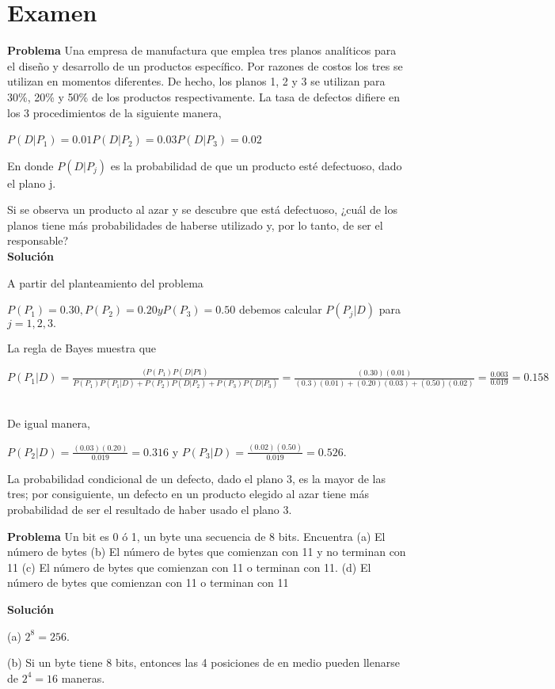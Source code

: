 \section{Examen}

\textbf{Problema}
Una empresa de manufactura que emplea tres planos analíticos para el diseño y
desarrollo de un productos específico. Por razones de costos los tres se
utilizan en momentos diferentes. De hecho, los planos 1, 2 y 3 se utilizan para
30\%, 20\% y 50\% de los productos respectivamente. La tasa de defectos difiere
en los 3 procedimientos de la siguiente manera,\

$P(D|P_1)=0.01 P(D|P_2)=0.03 P(D|P_3)=0.02 $ \

En donde $P(D|P_j)$ es la probabilidad de que un producto esté defectuoso, dado
el plano j.\

Si se observa un producto al azar y se descubre que está defectuoso, ¿cuál de
los planos tiene más probabilidades de haberse utilizado y, por lo tanto, de ser
el responsable?\\

\textbf{Solución} \

A partir del planteamiento del problema \

$P(P_1)=0.30, P(P_2)=0.20 y P(P_3)=0.50$ debemos calcular $P(P_j|D)$ para $j =
1, 2, 3.$

La regla de Bayes muestra que\

$P(P_1|D)=\frac{(P(P_1)P(D|P1)}{P(P_1)P(P_1|D)+P(P_2)P(D|P_2)+P(P_3)P(D|P_3)} =
\frac{(0.30)(0.01)}{(0.3)(0.01)+(0.20)(0.03)+(0.50)(0.02)}=\frac{0.003}{0.019}=0.158$\ 

De igual manera,\

$P(P_2|D) = \frac{(0.03)(0.20)}{0.019} = 0.316$ y
$P(P_3|D)=\frac{(0.02)(0.50)}{0.019}=0.526.$\

La probabilidad condicional de un defecto, dado el plano 3, es la mayor de las
tres; por consiguiente, un defecto en un producto elegido al azar tiene más
probabilidad de ser el resultado de haber usado el plano 3.

\textbf{Problema}
Un bit es 0 ó 1, un byte una secuencia de 8 bits. Encuentra (a) El número de
bytes (b) El número de bytes que comienzan con 11 y no terminan con 11 (c) El
número de bytes que comienzan con 11 o terminan con 11. (d) El número de bytes
que comienzan con 11 o terminan con 11

\textbf{Solución}\

(a) $2^8 = 256$.

(b) Si un byte tiene 8 bits, entonces las 4 posiciones de en medio pueden
llenarse de $2^4 = 16$ maneras. 

